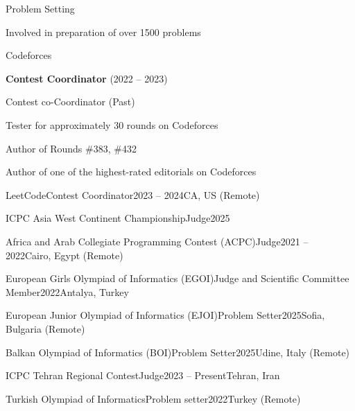 
\begin{section}{Problem Setting}

  \item Involved in preparation of over 1500 problems
  
  \begin{subsection}{Codeforces}{}{}{}
    \item \textbf{Contest Coordinator} (2022 – 2023)
    \item Contest co-Coordinator (Past)
    \item Tester for approximately 30 rounds on Codeforces
    \item Author of Rounds \#383, \#432
    \item Author of one of the highest-rated editorials on Codeforces
  \end{subsection}

  \begin{subsection}{LeetCode}{Contest Coordinator}{2023 -- 2024}{CA, US (Remote)}
  \end{subsection}

  \begin{subsection}{ICPC Asia West Continent Championship}{Judge}{2025}{}
  \end{subsection}

  \begin{subsection}{Africa and Arab Collegiate Programming Contest (ACPC)}{Judge}{2021 – 2022}{Cairo, Egypt (Remote)}
  \end{subsection}

  \begin{subsection}{European Girls Olympiad of Informatics (EGOI)}{Judge and Scientific Committee Member}{2022}{Antalya, Turkey}
  \end{subsection}

  \begin{subsection}{European Junior Olympiad of Informatics (EJOI)}{Problem Setter}{2025}{Sofia, Bulgaria (Remote)}
  \end{subsection}

  \begin{subsection}{Balkan Olympiad of Informatics (BOI)}{Problem Setter}{2025}{Udine, Italy (Remote)}
  \end{subsection}


  \begin{subsection}{ICPC Tehran Regional Contest}{Judge}{2023 – Present}{Tehran, Iran}
  \end{subsection}


  \begin{subsection}{Turkish Olympiad of Informatics}{Problem setter}{2022}{Turkey (Remote)}
  \end{subsection}


\end{section}
